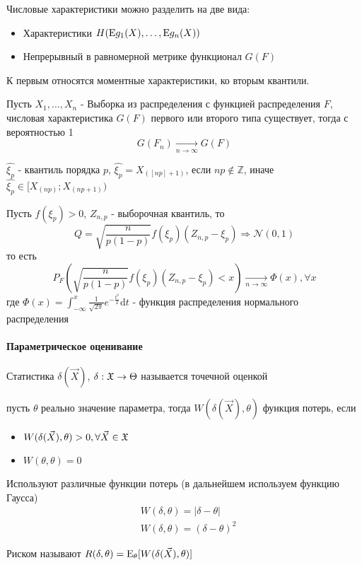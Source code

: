 \documentclass[main.tex]{subfiles}
\begin{document}
Числовые характеристики можно разделить на две вида:
\begin{itemize}
	\item Характеристики $H(\mathrm{E} g_1(X), \dots, \mathrm{E} g_n(X))$
	\item Непрерывный в равномерной метрике функционал $G(F)$
\end{itemize}
К первым относятся моментные характеристики, ко вторым квантили.
\begin{theorem}
	Пусть $X_1,\dots,X_n$ - Выборка из распределения с функцией распределения $F$, числовая характеристика $G(F)$ первого или второго типа существует, тогда с вероятностью 1
	$$G(F_n) \underset{n\rightarrow\infty}{\rightarrow}G(F)$$
\end{theorem}

\begin{definition}
	$\hat{\xi_p}$ - квантиль порядка $p$, $\hat{\xi_{p}}=X_{([np]+1)}$, если $np\notin\mathbb{Z}$, иначе $\hat{\xi_{p}}\in [X_{(np)};X_{(np+1)})$
\end{definition}

\begin{theorem}
	Пусть $f(\xi_p)>0$, $Z_{n,p}$ - выборочная квантиль, то $$Q=\sqrt{\frac{n}{p(1-p)}}f(\xi_p)(Z_{n,p} - \xi_p) \Rightarrow \mathcal{N}(0,1)$$ то есть $$ P_F(\sqrt{\frac{n}{p(1-p)}}f(\xi_p)(Z_{n,p} - \xi_p) < x) \underset{n\rightarrow\infty}{\rightarrow} \Phi(x), \forall x$$
	где $\Phi(x) = \int_{-\infty}^{x}\frac{1}{\sqrt{2\pi}}e^{-\frac{t^2}{2}}\mathrm{d}t$ - функция распределения нормального распределения
\end{theorem}

\paragraph{Параметрическое оценивание}
\begin{definition}
	Статистика $\delta ( \vec{X} )$, $\delta : \mathfrak{X} \rightarrow \Theta$ называется точечной оценкой
\end{definition}

\begin{definition}
	пусть $\theta$ реально значение параметра, тогда $W(\delta (\vec{X}),\theta)$ функция потерь, если
	\begin{itemize}
	 	\item $W(\delta (\vec{X}),\theta)>0,\forall \vec{X} \in \mathfrak{X}$
	 	\item $W(\theta,\theta)=0$
	 \end{itemize} 
\end{definition}
Используют различные функции потерь (в дальнейшем используем функцию Гаусса)
\begin{align}
	& W(\delta,\theta)=|\delta-\theta| \tag{Лаплас} \\
	& W(\delta,\theta)=(\delta-\theta)^2 \tag{Гаусс}
\end{align}

\begin{definition}[Риск]
	Риском называют $R(\delta,\theta) = \mathrm{E}_\theta[W(\delta(\vec{X}),\theta)]$
\end{definition}
\end{document}
